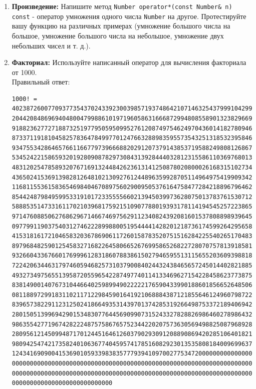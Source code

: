 \documentclass{article}
\begin{document}
\begin{enumerate}
\item \textbf{Произведение:} Напишите метод \texttt{Number operator*(const Number\& n) const} - оператор умножения одного числа \texttt{Number} на другое. Протестируйте вашу функцию на различных примерах (умножение большого числа на большое, умножение большого числа на небольшое, умножение двух небольших чисел и т. д.).
\item \textbf{Факториал:} Используйте написанный оператор для вычисления факториала от 1000. \\
Правильный ответ:
\begin{verbatim}
1000! = 40238726007709377354370243392300398571937486421071463254379991042993851239862902059
2044208486969404800479988610197196058631666872994808558901323829669944590997424504087073759
9188236277271887325197795059509952761208749754624970436014182780946464962910563938874378864
8733711918104582578364784997701247663288983595573543251318532395846307555740911426241747434
9347553428646576611667797396668820291207379143853719588249808126867838374559731746136085379
5345242215865932019280908782973084313928444032812315586110369768013573042161687476096758713
4831202547858932076716913244842623613141250878020800026168315102734182797770478463586817016
4365024153691398281264810213092761244896359928705114964975419909342221566832572080821333186
1168115536158365469840467089756029009505376164758477284218896796462449451607653534081989013
8544248798495995331910172335555660213945039973628075013783761530712776192684903435262520001
5888535147331611702103968175921510907788019393178114194545257223865541461062892187960223838
9714760885062768629671466746975629112340824392081601537808898939645182632436716167621791689
0977991190375403127462228998800519544441428201218736174599264295658174662830295557029902432
4153181617210465832036786906117260158783520751516284225540265170483304226143974286933061690
8979684825901254583271682264580665267699586526822728070757813918581788896522081643483448259
9326604336766017699961283186078838615027946595513115655203609398818061213855860030143569452
7224206344631797460594682573103790084024432438465657245014402821885252470935190620929023136
4932734975655139587205596542287497740114133469627154228458623773875382304838656889764619273
8381490014076731044664025989949022222176590433990188601856652648506179970235619389701786004
0811889729918311021171229845901641921068884387121855646124960798722908519296819372388642614
8396573822911231250241866493531439701374285319266498753372189406942814341185201580141233448
2801505139969429015348307764456909907315243327828826986460278986432113908350621709500259738
9863554277196742822248757586765752344220207573630569498825087968928162753848863396909959826
2809561214509948717012445164612603790293091208890869420285106401821543994571568059418727489
9809425474217358240106367740459574178516082923013535808184009699637252423056085590370062427
1243416909004153690105933983835777939410970027753472000000000000000000000000000000000000000
0000000000000000000000000000000000000000000000000000000000000000000000000000000000000000000
0000000000000000000000000000000000000000000000000000000000000000000000000000000000000000000
0000000000000000000000000000
\end{verbatim}



\end{enumerate}
\end{document}
